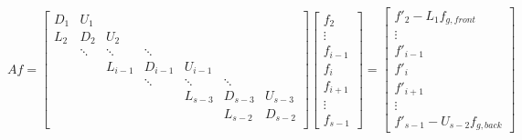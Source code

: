 \documentclass[11pt]{article}
\begin{document}
\[ Af = \left[
\begin{array}{ccccccccc}
D_{1} & U_{1}    &           &           &           &           &         \\
L_{2} & D_{2}    & U_{2}     &           &           &           &         \\
      & \ddots   & \ddots    & \ddots    &           &           &         \\
      &          & L_{i-1}   & D_{i-1}   & U_{i-1}   &           &         \\
      &          &           & \ddots    & \ddots    & \ddots    &         \\
      &          &           &           & L_{s-3}   & D_{s-3}   & U_{s-3} \\
      &          &           &           &           & L_{s-2}   & D_{s-2} \\
\end{array} \right] 
\left[ \begin{array}{c}
f_{2} \\ \vdots \\ f_{i-1} \\ f_{i} \\ f_{i+1} \\ \vdots \\ f_{s-1}
\end{array} \right]
=
\left[ \begin{array}{c}
f'_{2} - L_1 f_{g,front} \\ \vdots \\ 
f'_{i-1} \\ f'_{i} \\ f'_{i+1} \\ \vdots \\ f'_{s-1} - U_{s-2} f_{g,back}
\end{array} \right]
\]
\end{document}
